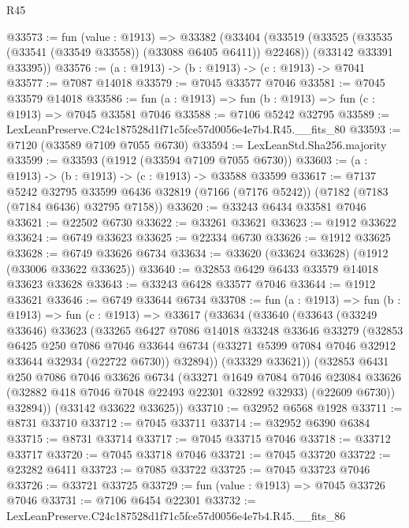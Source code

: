 \begin{lexlean}{R45}
\begin{coremodule}
{@33573 := fun (value : @1913) =>
  @33382
    (@33404
      (@33519 (@33525 (@33535 (@33541 (@33549 @33558)) (@33088 @6405 @6411)) @22468))
      (@33142 @33391 @33395))
@33576 := (a : @1913) -> (b : @1913) -> (c : @1913) -> @7041
@33577 := @7087 @14018
@33579 := @7045 @33577 @7046
@33581 := @7045 @33579 @14018
@33586 := fun (a : @1913) => fun (b : @1913) => fun (c : @1913) => @7045 @33581 @7046
@33588 := @7106 @5242 @32795
@33589 := LexLeanPreserve.C24c187528d1f71c5fce57d0056e4e7b4.R45.__fits_80
@33593 := @7120 (@33589 @7109 @7055 @6730)
@33594 := LexLeanStd.Sha256.majority
@33599 := @33593 (@1912 (@33594 @7109 @7055 @6730))
@33603 := (a : @1913) -> (b : @1913) -> (c : @1913) -> @33588 @33599
@33617 := @7137
    @5242
    @32795
    @33599
    @6436
    @32819
    (@7166 (@7176 @5242))
    (@7182 (@7183 (@7184 @6436) @32795 @7158))
@33620 := @33243 @6434 @33581 @7046
@33621 := @22502 @6730
@33622 := @33261 @33621
@33623 := @1912 @33622
@33624 := @6749 @33623
@33625 := @22334 @6730
@33626 := @1912 @33625
@33628 := @6749 @33626 @6734
@33634 := @33620 (@33624 @33628) (@1912 (@33006 @33622 @33625))
@33640 := @32853 @6429 @6433 @33579 @14018 @33623 @33628
@33643 := @33243 @6428 @33577 @7046
@33644 := @1912 @33621
@33646 := @6749 @33644 @6734
@33708 := fun (a : @1913) =>
  fun (b : @1913) =>
  fun (c : @1913) =>
  @33617
    (@33634
      (@33640
        (@33643
          (@33249 @33646)
          @33623
          (@33265
            @6427
            @7086
            @14018
            @33248
            @33646
            @33279
            (@32853
              @6425
              @250
              @7086
              @7046
              @33644
              @6734
              (@33271 @5399 @7084 @7046 @32912 @33644 @32934 (@22722 @6730))
              @32894))
          (@33329 @33621))
        (@32853
          @6431
          @250
          @7086
          @7046
          @33626
          @6734
          (@33271
            @1649
            @7084
            @7046
            @23084
            @33626
            (@32882 @418 @7046 @7048 @22493 @22301 @32892 @32933)
            (@22609 @6730))
          @32894))
      (@33142 @33622 @33625))
@33710 := @32952 @6568 @1928
@33711 := @8731 @33710
@33712 := @7045 @33711
@33714 := @32952 @6390 @6384
@33715 := @8731 @33714
@33717 := @7045 @33715 @7046
@33718 := @33712 @33717
@33720 := @7045 @33718 @7046
@33721 := @7045 @33720
@33722 := @23282 @6411
@33723 := @7085 @33722
@33725 := @7045 @33723 @7046
@33726 := @33721 @33725
@33729 := fun (value : @1913) => @7045 @33726 @7046
@33731 := @7106 @6454 @22301
@33732 := LexLeanPreserve.C24c187528d1f71c5fce57d0056e4e7b4.R45.__fits_86
}
\end{coremodule}
\end{lexlean}
